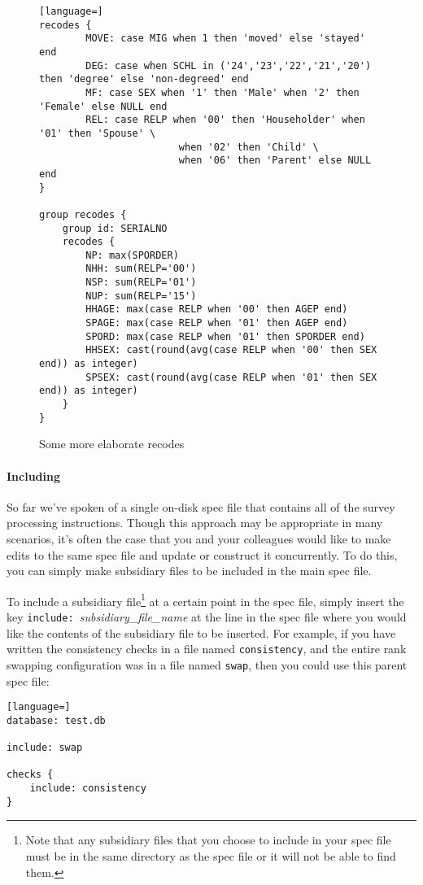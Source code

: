 \documentclass{article}
\begin{document}
\begin{figure}
\begin{lstlisting}[language=]
recodes {
        MOVE: case MIG when 1 then 'moved' else 'stayed' end
        DEG: case when SCHL in ('24','23','22','21','20') then 'degree' else 'non-degreed' end
        MF: case SEX when '1' then 'Male' when '2' then 'Female' else NULL end
        REL: case RELP when '00' then 'Householder' when '01' then 'Spouse' \
                        when '02' then 'Child' \
                        when '06' then 'Parent' else NULL end
}

group recodes {
    group id: SERIALNO
    recodes {
        NP: max(SPORDER)
        NHH: sum(RELP='00')
        NSP: sum(RELP='01')
        NUP: sum(RELP='15')
        HHAGE: max(case RELP when '00' then AGEP end)
        SPAGE: max(case RELP when '01' then AGEP end)
        SPORD: max(case RELP when '01' then SPORDER end)
        HHSEX: cast(round(avg(case RELP when '00' then SEX end)) as integer)
        SPSEX: cast(round(avg(case RELP when '01' then SEX end)) as integer)
    }
}
\end{lstlisting}
\caption{Some more elaborate recodes}\label{morerecodes}
\end{figure}

\paragraph{Including} So far we've spoken of a single on-disk spec file that contains
all of the survey processing instructions.  Though this approach may be appropriate
in many scenarios, it's often the case that you and your colleagues would like to
make edits to the same spec file and update or construct it concurrently. To do this,
you can simply make subsidiary files to be included in the main spec file.

To include a subsidiary file\footnote{Note that any subsidiary files that you choose
to include in your spec file must be in the same directory as the spec file or it
will not be able to find them.} at a certain point in the spec file, simply insert
the key {\tt include: }\textit{subsidiary\_file\_name} at the line in the spec file
where you would like the contents of the subsidiary file to be inserted. For example,
if you have written the consistency checks in a file named {\tt consistency}, and the
entire rank swapping configuration was in a file named {\tt swap}, then you could use
this parent spec file:

\begin{lstlisting}[language=]
database: test.db

include: swap

checks {
    include: consistency
}
\end{lstlisting}
\end{document}
